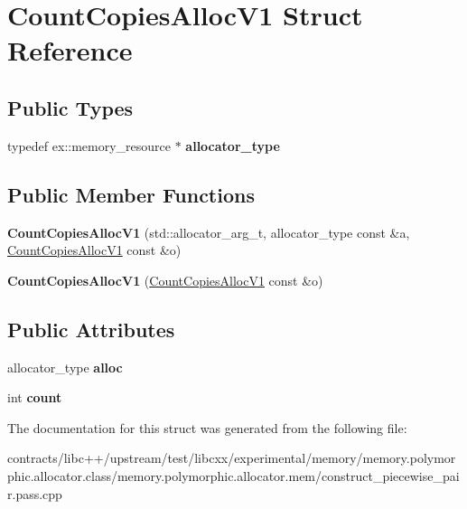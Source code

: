 \hypertarget{struct_count_copies_alloc_v1}{}\section{Count\+Copies\+Alloc\+V1 Struct Reference}
\label{struct_count_copies_alloc_v1}
\subsection*{Public Types}
\begin{DoxyCompactItemize}
\item 
\mbox{\label{struct_count_copies_alloc_v1_ae55c56020809f81bf6358d3547fcfd78}} 
typedef ex\+::memory\+\_\+resource $\ast$ {\bfseries allocator\+\_\+type}
\end{DoxyCompactItemize}
\subsection*{Public Member Functions}
\begin{DoxyCompactItemize}
\item 
\mbox{\label{struct_count_copies_alloc_v1_a0bc930bac2a57ed2c320c019d2e4e3fa}} 
{\bfseries Count\+Copies\+Alloc\+V1} (std\+::allocator\+\_\+arg\+\_\+t, allocator\+\_\+type const \&a, \mbox{\hyperlink{struct_count_copies_alloc_v1}{Count\+Copies\+Alloc\+V1}} const \&o)
\item 
\mbox{\label{struct_count_copies_alloc_v1_aace427f85c63c735db1b539d36b4c47a}} 
{\bfseries Count\+Copies\+Alloc\+V1} (\mbox{\hyperlink{struct_count_copies_alloc_v1}{Count\+Copies\+Alloc\+V1}} const \&o)
\end{DoxyCompactItemize}
\subsection*{Public Attributes}
\begin{DoxyCompactItemize}
\item 
\mbox{\label{struct_count_copies_alloc_v1_a786f3fe86d024f6f90554d725598a927}} 
allocator\+\_\+type {\bfseries alloc}
\item 
\mbox{\label{struct_count_copies_alloc_v1_ab7563b81ac8bf28d5e909ff29ffc2a1c}} 
int {\bfseries count}
\end{DoxyCompactItemize}


The documentation for this struct was generated from the following file\+:\begin{DoxyCompactItemize}
\item 
contracts/libc++/upstream/test/libcxx/experimental/memory/memory.\+polymorphic.\+allocator.\+class/memory.\+polymorphic.\+allocator.\+mem/construct\+\_\+piecewise\+\_\+pair.\+pass.\+cpp\end{DoxyCompactItemize}
